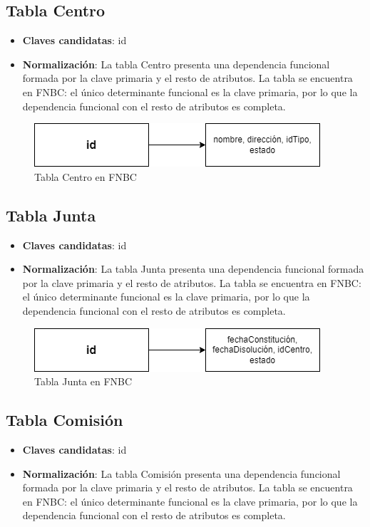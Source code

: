 \subsection{Tabla Centro}
    \begin{itemize}
        \item \textbf{Claves candidatas}: id
        \item \textbf{Normalización}: La tabla Centro presenta una dependencia funcional formada por la clave primaria y el resto de atributos. La tabla se encuentra en FNBC: el único determinante funcional es la clave primaria, por lo que la dependencia funcional con el resto de atributos es completa.
    \end{itemize}

\begin{figure}[H]
\centering
\includegraphics[scale=0.75]{img/diagramas/Datos/FNBC-Centro.png}
\caption{Tabla Centro en FNBC}\label{fig:Tabla Centro en FNBC}   
\end{figure}

\subsection{Tabla Junta}
    \begin{itemize}
        \item \textbf{Claves candidatas}: id
        \item \textbf{Normalización}: La tabla Junta presenta una dependencia funcional formada por la clave primaria y el resto de atributos. La tabla se encuentra en FNBC: el único determinante funcional es la clave primaria, por lo que la dependencia funcional con el resto de atributos es completa.
    \end{itemize}

\begin{figure}[H]
\centering
\includegraphics[scale=0.75]{img/diagramas/Datos/FNBC-Junta.png}
\caption{Tabla Junta en FNBC}\label{fig:Tabla Junta en FNBC}   
\end{figure}

\subsection{Tabla Comisión}
    \begin{itemize}
        \item \textbf{Claves candidatas}: id
        \item \textbf{Normalización}: La tabla Comisión presenta una dependencia funcional formada por la clave primaria y el resto de atributos. La tabla se encuentra en FNBC: el único determinante funcional es la clave primaria, por lo que la dependencia funcional con el resto de atributos es completa.
    \end{itemize}

